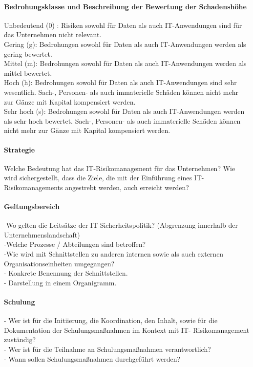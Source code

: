 \paragraph {Bedrohungsklasse und Beschreibung der Bewertung der Schadenshöhe}
Unbedeutend (0) : Risiken sowohl für Daten als auch IT-Anwendungen sind für das Unternehmen nicht relevant.
\\Gering (g): Bedrohungen sowohl für Daten als auch IT-Anwendungen werden als gering bewertet.
\\Mittel (m): Bedrohungen sowohl für Daten als auch IT-Anwendungen werden als mittel bewertet.
\\Hoch (h): Bedrohungen sowohl für Daten als auch IT-Anwendungen sind sehr wesentlich. Sach-, Personen- als auch immaterielle Schäden können nicht mehr zur Gänze mit Kapital kompensiert werden.
\\ Sehr hoch (s): Bedrohungen sowohl für Daten als auch IT-Anwendungen werden als sehr hoch bewertet. Sach-, Personen- als auch immaterielle Schäden können nicht mehr zur Gänze mit Kapital kompensiert werden.
\paragraph{Strategie}
Welche Bedeutung hat das IT-Risikomanagement für das Unternehmen? 
Wie wird sichergestellt, dass die Ziele, die mit der Einführung eines IT-Risikomanagements angestrebt werden, auch erreicht werden?
\paragraph{Geltungsbereich}
-Wo gelten die Leitsätze der IT-Sicherheitspolitik? (Abgrenzung innerhalb der Unternehmenslandschaft)
\\-Welche Prozesse / Abteilungen sind betroffen?
\\-Wie wird mit Schnittstellen zu anderen internen sowie als auch externen Organisationseinheiten umgegangen?
\\- Konkrete Benennung der Schnittstellen.
\\- Darstellung in einem Organigramm.
\paragraph{Schulung}
- Wer ist für die Initiierung, die Koordination, den Inhalt, sowie für die Dokumentation der Schulungsmaßnahmen im Kontext mit IT- Risikomanagement zuständig?
\\- Wer ist für die Teilnahme an Schulungsmaßnahmen verantwortlich?
\\- Wann sollen Schulungsmaßnahmen durchgeführt werden?

